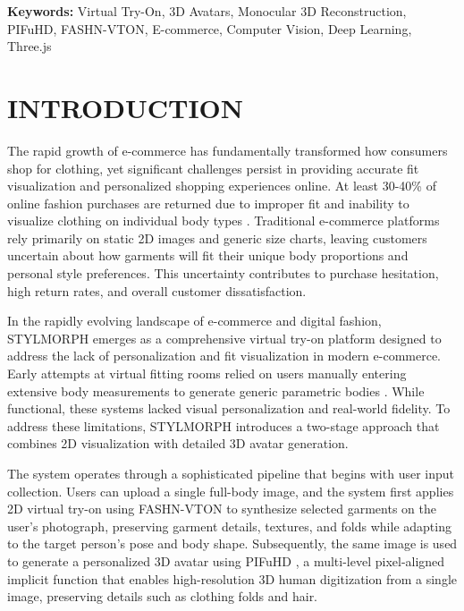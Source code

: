 \documentclass[12pt,a4paper,oneside]{report}
\begin{document}
\vspace{0.3cm}

\noindent
\textbf{Keywords:} Virtual Try-On, 3D Avatars, Monocular 3D Reconstruction, PIFuHD, FASHN-VTON, E-commerce, Computer Vision, Deep Learning, Three.js

\tableofcontents
\listoffigures
\listoftables

\newpage

\chapter{INTRODUCTION}

The rapid growth of e-commerce has fundamentally transformed how consumers shop for clothing, yet significant challenges persist in providing accurate fit visualization and personalized shopping experiences online. At least 30-40\% of online fashion purchases are returned due to improper fit and inability to visualize clothing on individual body types \cite{5}. Traditional e-commerce platforms rely primarily on static 2D images and generic size charts, leaving customers uncertain about how garments will fit their unique body proportions and personal style preferences. This uncertainty contributes to purchase hesitation, high return rates, and overall customer dissatisfaction.

In the rapidly evolving landscape of e-commerce and digital fashion, STYLMORPH emerges as a comprehensive virtual try-on platform designed to address the lack of personalization and fit visualization in modern e-commerce. Early attempts at virtual fitting rooms relied on users manually entering extensive body measurements to generate generic parametric bodies \cite{7}. While functional, these systems lacked visual personalization and real-world fidelity. To address these limitations, STYLMORPH introduces a two-stage approach that combines 2D visualization with detailed 3D avatar generation.

The system operates through a sophisticated pipeline that begins with user input collection. Users can upload a single full-body image, and the system first applies 2D virtual try-on using FASHN-VTON \cite{16} to synthesize selected garments on the user's photograph, preserving garment details, textures, and folds while adapting to the target person's pose and body shape. Subsequently, the same image is used to generate a personalized 3D avatar using PIFuHD \cite{1}, a multi-level pixel-aligned implicit function that enables high-resolution 3D human digitization from a single image, preserving details such as clothing folds and hair.
\end{document}
